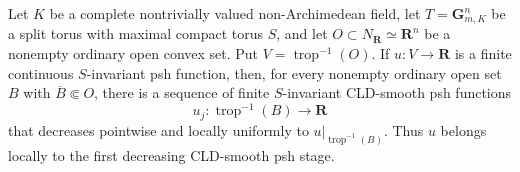 \begin{corollary}
\label{cor:p024-invariant-toric-cld-smooth-regularization}
Let \(K\) be a complete nontrivially valued non-Archimedean field, let
\(T=\mathbf G_{m,K}^n\) be a split torus with maximal compact torus \(S\),
and let \(O\subset N_{\mathbf R}\simeq\mathbf R^n\) be a nonempty ordinary
open convex set.  Put \(V=\operatorname{trop}^{-1}(O)\).  If
\(u:V\to\mathbf R\) is a finite continuous \(S\)-invariant psh function,
then, for every nonempty ordinary open set \(B\) with \(\overline B\Subset O\),
there is a sequence of finite \(S\)-invariant CLD-smooth psh functions
\[
                    u_j:\operatorname{trop}^{-1}(B)\longrightarrow\mathbf R
\]
that decreases pointwise and locally uniformly to
\(u|_{\operatorname{trop}^{-1}(B)}\).  Thus \(u\) belongs locally to the
first decreasing CLD-smooth psh stage.
\end{corollary}
